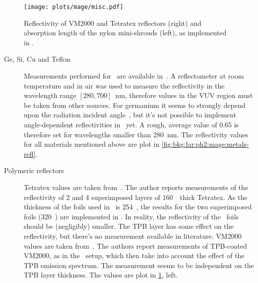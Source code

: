 \begin{figure}
  \centering
  \texttt{[image: plots/mage/misc.pdf]}
  \caption{%
    Reflectivity of VM2000 and Tetratex\reg{} reflectors (right) and absorption length
    of the nylon mini-shrouds (left), as implemented in \mage.
  }\label{fig:bkg:lar:ph2:mage:misc}
\end{figure}

\begin{description}
  \item[Ge, Si, Cu and Teflon] Measurements performed for \gerda\ are available
    in~\cite{Wegmann2017}.  A reflectometer at room temperature and in air was used to
    measure the reflectivity in the wavelength range $[280, 700]$~nm, therefore values in
    the VUV region must be taken from other sources. For germanium it seems to strongly
    depend upon the radiation incident angle~\cite{Marton1967}, but it's not possible to
    implement angle-dependent reflectivities in \geant\ yet. A rough, average value of
    0.65 is therefore set for wavelengths smaller than 280~nm. The reflectivity values for
    all materials mentioned above are plot in \cref{fig:bkg:lar:ph2:mage:metals-refl}.

  \item[Polymeric reflectors] Tetratex\reg{} values are taken from~\cite{Janecek2012}. The
    author reports measurements of the reflectivity of 2 and 4 superimposed layers of
    160~\mum\ thick Tetratex\reg{}. As the thickness of the foils used in \gerda\ is
    254~\mum, the results for the two superimposed foils (320~\mum) are implemented in
    \mage. In reality, the reflectivity of the \gerda\ foils should be (negligibly)
    smaller. The TPB layer has some effect on the reflectivity, but there's no measurement
    available in literature.  VM2000 values are taken from~\cite{Francini2013}.  The
    authors report measurements of TPB-coated VM2000, as in the \gerda\ setup, which then
    take into account the effect of the TPB emission spectrum. The measurement seems to be
    independent on the TPB layer thickness. The values are plot in
    \cref{fig:bkg:lar:ph2:mage:misc}, left.

\end{description}

